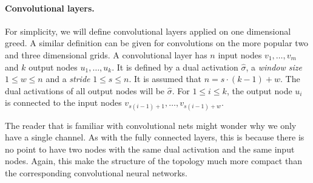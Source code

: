 \paragraph{Convolutional layers.}
For simplicity, we will define convolutional layers applied on one dimensional greed. A similar definition can be given for convolutions on the more popular two and three dimensional grids.
A convolutional layer has $n$ input nodes $v_1,\ldots,v_m$ and $k$ output nodes $u_1,\ldots,u_k$. It is defined by a dual activation $\hat\sigma$, a {\em window size} $1\le w\le n$ and a {\em stride} $1\le s \le n$. It is assumed that $n=s\cdot (k-1) + w$. The dual activations of all output nodes will be $\hat\sigma$. For $1\le i \le k$, the output node $u_i$ is connected to the input nodes $v_{s(i-1)+1},\ldots,v_{s(i-1)+w}$.

\begin{remark}
The reader that is familiar with convolutional nets might wonder why we only have a single channel. As with the fully connected layers, this is because there is no point to have two nodes with the same dual activation and the same input nodes. Again, this make the structure of the topology much more compact than the corresponding convolutional neural networks.
\end{remark}

